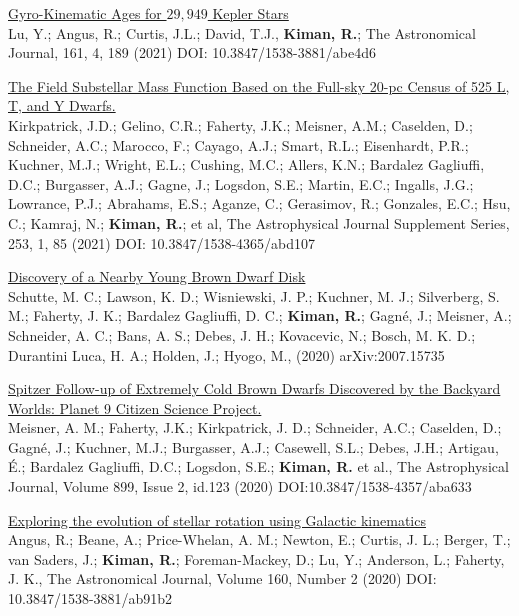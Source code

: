 \documentclass[10pt]{cv}
\begin{document}
\begin{llist}
\begin{etaremune}
  \item \href{https://ui.adsabs.harvard.edu/abs/2021arXiv210201772Y/abstract}{Gyro-Kinematic Ages for $29,949$ Kepler Stars}\\ Lu, Y.; Angus, R.; Curtis, J.L.; David, T.J., \textbf{​Kiman, R.}​; The Astronomical Journal, 161,  4, 189 (2021) DOI: 10.3847/1538-3881/abe4d6

  \item \href{https://ui.adsabs.harvard.edu/abs/2021ApJS..253....7K/abstract}{The Field Substellar Mass Function Based on the Full-sky 20-pc Census of 525 L, T, and Y Dwarfs.}\\ Kirkpatrick, J.D.; Gelino, C.R.; Faherty, J.K.; Meisner, A.M.; Caselden, D.; Schneider, A.C.; Marocco, F.; Cayago, A.J.; Smart, R.L.; Eisenhardt, P.R.; Kuchner, M.J.; Wright, E.L.; Cushing, M.C.; Allers, K.N.; Bardalez Gagliuffi, D.C.; Burgasser, A.J.; Gagne, J.; Logsdon, S.E.; Martin, E.C.; Ingalls, J.G.; Lowrance, P.J.; Abrahams, E.S.; Aganze, C.; Gerasimov, R.; Gonzales, E.C.; Hsu, C.; Kamraj, N.; \textbf{​Kiman, R.}​; et al, The Astrophysical Journal Supplement Series, 253, 1, 85 (2021) DOI: 10.3847/1538-4365/abd107

  \item \href{https://ui.adsabs.harvard.edu/abs/2020AJ....160..156S/abstract}{Discovery of a Nearby Young Brown Dwarf Disk}\\ Schutte, M. C.; Lawson, K. D.; Wisniewski, J. P.; Kuchner, M. J.; Silverberg, S. M.; Faherty, J. K.; Bardalez Gagliuffi, D. C.; \textbf{Kiman, R.}; Gagné, J.; Meisner, A.; Schneider, A. C.; Bans, A. S.; Debes, J. H.; Kovacevic, N.; Bosch, M. K. D.; Durantini Luca, H. A.; Holden, J.; Hyogo, M., (2020) arXiv:2007.15735

  \item \href{https://ui.adsabs.harvard.edu/abs/2020ApJ...899..123M/abstract}{Spitzer Follow-up of Extremely Cold Brown Dwarfs Discovered by the Backyard Worlds: Planet 9 Citizen Science Project.}\\ Meisner, A. M.; Faherty, J.K.; Kirkpatrick, J. D.; Schneider, A.C.; Caselden, D.; Gagné, J.; Kuchner, M.J.; Burgasser, A.J.; Casewell, S.L.; Debes, J.H.; Artigau, É.; Bardalez Gagliuffi, D.C.; Logsdon, S.E.; \textbf{Kiman, R.} et al., The Astrophysical Journal, Volume 899, Issue 2, id.123 (2020) DOI:10.3847/1538-4357/aba633

  \item \href{https://ui.adsabs.harvard.edu/abs/2020AJ....160...90A/abstract}{Exploring the evolution of stellar rotation using Galactic kinematics}\\ Angus, R.; Beane, A.; Price-Whelan, A. M.; Newton, E.; Curtis, J. L.; Berger, T.; van Saders, J.; \textbf{Kiman, R.}; Foreman-Mackey, D.; Lu, Y.; Anderson, L.; Faherty, J. K., The Astronomical Journal, Volume 160, Number 2 (2020) DOI: 10.3847/1538-3881/ab91b2


\end{etaremune}
\end{llist}
\end{document}
